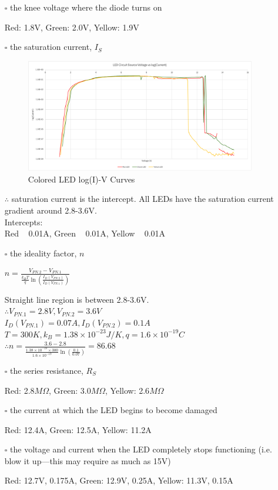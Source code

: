 \documentclass[12pt]{article}
\begin{document}
\begin{itemize}
\item[$\square$] the knee voltage where the diode turns on

Red: 1.8V, Green: 2.0V, Yellow: 1.9V
\newpage

\item[$\square$] the saturation current, $I_S$
\begin{figure}[h]
    \centering
    \includegraphics[width=0.95\textwidth]{log_LED.png}
    \caption{Colored LED log(I)-V Curves}
    \label{fig:colored-leds-2}
\end{figure}

$\therefore$ saturation current is the intercept.
All LEDs have the saturation current gradient around 2.8-3.6V. \\
Intercepts: \\
Red ~ 0.01A,
Green ~ 0.01A,
Yellow ~ 0.01A

\item[$\square$] the ideality factor, $n$

$n = \frac{V_{PN.2} - V_{PN.1}}{\frac{k_B T}{q} \ln\left(\frac{I_D(V_{PN.2})}{I_D(V_{PN.1})}\right)}$

Straight line region is between 2.8-3.6V. \\

$\therefore V_{PN.1} = 2.8V, V_{PN.2} = 3.6V$ \\
$I_D(V_{PN.1}) = 0.07A, I_D(V_{PN.2}) = 0.1A$ \\

$T = 300K, k_B = 1.38 \times 10^{-23} J/K, q = 1.6 \times 10^{-19} C$ \\

$\therefore n = \frac{3.6 - 2.8}{\frac{1.38 \times 10^{-23} \times 300}{1.6 \times 10^{-19}} \ln\left(\frac{0.1}{0.07}\right)} = 86.68$

\item[$\square$] the series resistance, $R_S$

Red: 2.8$M\Omega$, Green: 3.0$M\Omega$, Yellow: 2.6$M\Omega$

\item[$\square$] the current at which the LED begins to become
damaged

Red: 12.4A, Green: 12.5A, Yellow: 11.2A

\item[$\square$] the voltage and current when the LED completely
stops functioning (i.e. blow it up---this may require as much as
15V)

Red: 12.7V, 0.175A, Green: 12.9V, 0.25A, Yellow: 11.3V, 0.15A
\end{itemize}
\newpage
\setcounter{section}{4}
\end{document}
